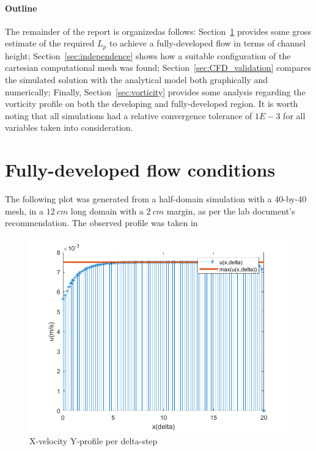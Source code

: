 \documentclass[12pt]{article}
\begin{document}
        \paragraph{Outline}
        The remainder of the report is organizedas follows: Section~\ref{sec:developed_flow} provides some gross estimate of the required \( L_p \) to achieve a fully-developed flow in terms of channel height; Section~\ref{sec:independence} shows how a suitable configuration of the cartesian computational mesh was found; Section~\ref{sec:CFD_validation} compares the simulated solution with the analytical model both graphically and numerically; Finally, Section~\ref{sec:vorticity} provides some analysis regarding the vorticity profile on both the developing and fully-developed region. It is worth noting that all simulations had a relative convergence tolerance of $ 1E-3 $ for all variables taken into consideration.

\section{Fully-developed flow conditions} \label{sec:developed_flow}

        The following plot was generated from a half-domain simulation with a 40-by-40 mesh, in a $ 12 \: cm $ long domain with a $ 2 \: cm $ margin, as per the lab document's recommendation. The observed profile was taken in

        \begin{figure}[!ht]
                \includegraphics[width=\textwidth]{Fully_Developed_Francesco.png}
                \centering
                \caption{X-velocity Y-profile per delta-step}
                \label{fig:delta-steps}
        \end{figure}
\end{document}
